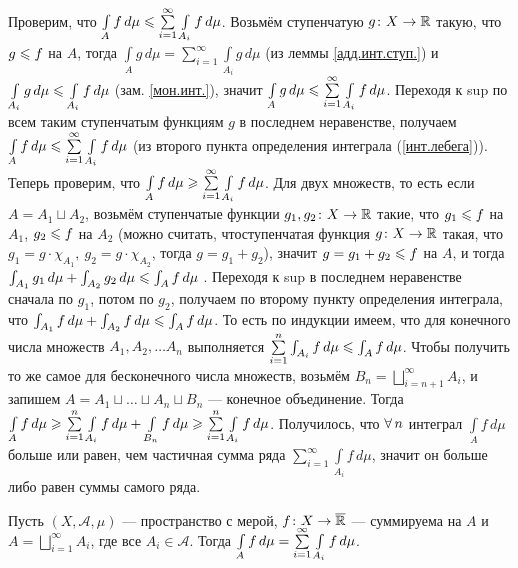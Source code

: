 \begin{prf}
	Проверим, что $\int\limits_A f\, d\mu \leqslant \sum\limits_{i = 1}^\infty \int\limits_{A_i}f\,d\mu$. Возьмём ступенчатую $g \colon X \to \mathbb R$ такую, что $g \leqslant f$ на $A$, тогда $\int\limits_A g \, d\mu = \sum\limits_{i = 1}^\infty \int\limits_{A_i} g \, d\mu$ (из леммы \ref{адд.инт.ступ.}) и  $\int\limits_{A_i} g \, d\mu \leqslant \int\limits_{A_i} f \, d\mu$ (зам. \ref{мон.инт.}), значит $\int\limits_A g \, d\mu \leqslant \sum\limits_{i = 1}^\infty \int\limits_{A_i} f \, d\mu$. Переходя к sup по всем таким ступенчатым функциям $g$ в последнем неравенстве, получаем $\int\limits_A f\, d\mu \leqslant \sum\limits_{i = 1}^\infty \int\limits_{A_i}f\,d\mu$ (из второго пункта определения интеграла (\ref{инт.лебега})).\\
	Теперь проверим, что $\int\limits_A f\, d\mu \geqslant \sum\limits_{i = 1}^\infty \int\limits_{A_i}f\,d\mu$. Для двух множеств, то есть если $A = A_1 \sqcup A_2$, возьмём ступенчатые функции $g_1, g_2 \colon X \to \mathbb R$ такие, что $g_1 \leqslant f$ на $A_1$, $g_2 \leqslant f$ на $A_2$ (можно считать, что\E ступенчатая функция $g \colon X \to \mathbb R$ такая, что $g_1= g \cdot \chi_{A_1},\ g_2 = g \cdot \chi_{A_2}$, тогда $g = g_1 + g_2$), значит $g = g_1 + g_2 \leqslant f$ на $A$, и тогда $\int_{A_1} g_1 \, d\mu+ \int_{A_2} g_2\, d\mu \leqslant \int_A f \, d\mu$ . Переходя к sup в последнем неравенстве сначала по $g_1$, потом по $g_2$, получаем по второму пункту определения интеграла, что  $\int_{A_1} f \, d\mu+ \int_{A_2} f\, d\mu \leqslant \int_A f \, d\mu$. То есть по индукции имеем, что для конечного числа множеств $A_1, A_2, \ldots A_n$ выполняется $\sum\limits_{i = 1}^n \int_{A_i} f \, d\mu \leqslant \int_A f \, d\mu$. Чтобы получить то же самое для бесконечного числа множеств, возьмём $B_n = \bigsqcup\limits_{i = n + 1}^\infty A_i$, и запишем $A = A_1 \sqcup \ldots \sqcup A_n \sqcup B_n$ --- конечное объединение. Тогда $\int\limits_A f \, d\mu \geqslant \sum\limits_{i = 1}^n \int\limits_{A_i}f \, d\mu + \int\limits_{B_n} f \, d\mu \geqslant \sum\limits_{i = 1}^n \int\limits_{A_i}f \, d\mu$. Получилось, что $\forall \, n$ интеграл $\int\limits_A f \, d\mu$ больше или равен, чем  частичная сумма ряда $ \sum\limits_{i = 1}^\infty \int\limits_{A_i}f \, d\mu$, значит он больше либо равен суммы самого ряда.
\end{prf}

\begin{slv}
	Пусть $(X, \mathcal A, \mu)$ --- пространство с мерой, $f \colon X \to \overline{\mathbb R}$ --- суммируема на $A$ и $A = \bigsqcup\limits_{i = 1}^\infty A_i$, где все $A_i \in \mathcal A$. Тогда $\int\limits_A f\, d\mu = \raisebox{0pt}[0pt]{$\sum\limits_{i = 1}^\infty$} \int\limits_{A_i}f\,d\mu$. 
\end{slv}

